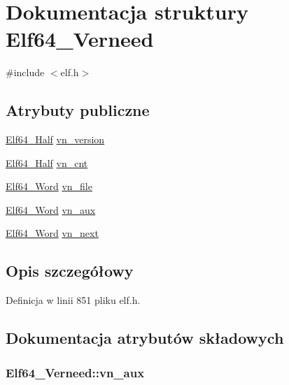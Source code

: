 \hypertarget{struct_elf64___verneed}{\section{Dokumentacja struktury Elf64\-\_\-\-Verneed}
\label{struct_elf64___verneed}
}


{\ttfamily \#include $<$elf.\-h$>$}

\subsection*{Atrybuty publiczne}
\begin{DoxyCompactItemize}
\item 
\hyperlink{elf_8h_adb6a5584018b431da3472e7c6a7fd731}{Elf64\-\_\-\-Half} \hyperlink{struct_elf64___verneed_abbe3d560e7f69253f3c468f2c9d30f99}{vn\-\_\-version}
\item 
\hyperlink{elf_8h_adb6a5584018b431da3472e7c6a7fd731}{Elf64\-\_\-\-Half} \hyperlink{struct_elf64___verneed_ab8bae5b901cc7007685f35d43cf63884}{vn\-\_\-cnt}
\item 
\hyperlink{elf_8h_aa3aa1920ed115b7ef7e99716fece4401}{Elf64\-\_\-\-Word} \hyperlink{struct_elf64___verneed_acb9149fec79d7eefb3f1d6300be2125f}{vn\-\_\-file}
\item 
\hyperlink{elf_8h_aa3aa1920ed115b7ef7e99716fece4401}{Elf64\-\_\-\-Word} \hyperlink{struct_elf64___verneed_a0b9d3ccbab06cb391f169987b1dbff0f}{vn\-\_\-aux}
\item 
\hyperlink{elf_8h_aa3aa1920ed115b7ef7e99716fece4401}{Elf64\-\_\-\-Word} \hyperlink{struct_elf64___verneed_a8036329a9f5ad3a4006f16cbe3c9e866}{vn\-\_\-next}
\end{DoxyCompactItemize}


\subsection{Opis szczegółowy}


Definicja w linii 851 pliku elf.\-h.



\subsection{Dokumentacja atrybutów składowych}
\hypertarget{struct_elf64___verneed_a0b9d3ccbab06cb391f169987b1dbff0f}{
\subsubsection[{vn\-\_\-aux}]{ Elf64\-\_\-\-Verneed\-::vn\-\_\-aux}}\label{struct_elf64___verneed_a0b9d3ccbab06cb391f169987b1dbff0f}


